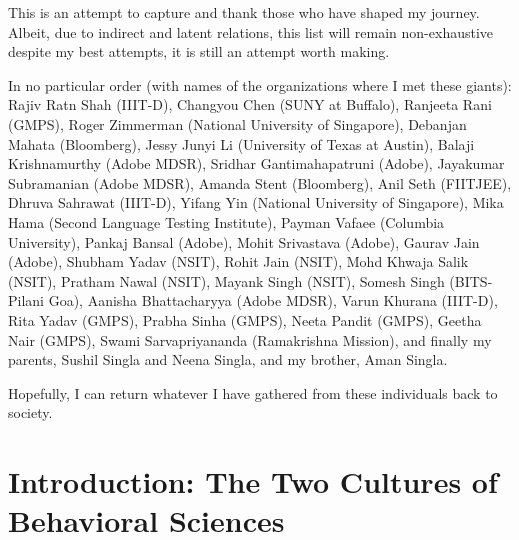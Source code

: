 \documentclass[PhD]{iiitd}
\begin{document}
This is an attempt to capture and thank those who have shaped my journey. Albeit, due to indirect and latent relations, this list will remain non-exhaustive despite my best attempts, it is still an attempt worth making.

In no particular order (with names of the organizations where I met these giants): Rajiv Ratn Shah (IIIT-D), Changyou Chen (SUNY at Buffalo), Ranjeeta Rani (GMPS), Roger Zimmerman (National University of Singapore), Debanjan Mahata (Bloomberg), Jessy Junyi Li (University of Texas at Austin), Balaji Krishnamurthy (Adobe MDSR), Sridhar Gantimahapatruni (Adobe), Jayakumar Subramanian (Adobe MDSR), Amanda Stent (Bloomberg), Anil Seth (FIITJEE), Dhruva Sahrawat (IIIT-D), Yifang Yin (National University of Singapore), Mika Hama (Second Language Testing Institute), Payman Vafaee (Columbia University), Pankaj Bansal (Adobe), Mohit Srivastava (Adobe), Gaurav Jain (Adobe), Shubham Yadav (NSIT), Rohit Jain (NSIT), Mohd Khwaja Salik (NSIT), Pratham Nawal (NSIT), Mayank Singh (NSIT), Somesh Singh (BITS-Pilani Goa), Aanisha Bhattacharyya (Adobe MDSR), Varun Khurana (IIIT-D), Rita Yadav (GMPS), Prabha Sinha (GMPS), Neeta Pandit (GMPS), Geetha Nair (GMPS), Swami Sarvapriyananda (Ramakrishna Mission), and finally my parents, Sushil Singla and Neena Singla, and my brother, Aman Singla.


Hopefully, I can return whatever I have gathered from these individuals back to society.
\clearpage



{\small\tableofcontents}






\chapter{Introduction: The Two Cultures of Behavioral Sciences}
\setcounter{page}{1}

\end{document}
